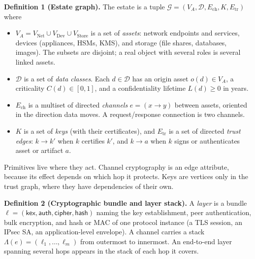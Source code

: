 \documentclass[conference]{IEEEtran}
\newenvironment{envblock}{\par\smallskip\noindent\ignorespaces}{\par\smallskip}
\begin{document}
\begin{envblock}

\textbf{Definition 1 (Estate graph).} The estate is a tuple $\mathcal{G} = (V_A, \mathcal{D}, E_{\mathrm{ch}}, K, E_{\mathrm{tr}})$ where

\begin{itemize}
\item $V_A = V_{\mathrm{Net}} \cup V_{\mathrm{Dev}} \cup V_{\mathrm{Store}}$ is a set of \emph{assets}: network endpoints and services, devices (appliances, HSMs, KMS), and storage (file shares, databases, images). The subsets are disjoint; a real object with several roles is several linked assets.
\item $\mathcal{D}$ is a set of \emph{data classes}. Each $d \in \mathcal{D}$ has an origin asset $o(d) \in V_A$, a criticality $C(d) \in [0,1]$, and a confidentiality lifetime $L(d) \ge 0$ in years.
\item $E_{\mathrm{ch}}$ is a multiset of directed \emph{channels} $e = (x \to y)$ between assets, oriented in the direction data moves. A request/response connection is two channels.
\item $K$ is a set of \emph{keys} (with their certificates), and $E_{\mathrm{tr}}$ is a set of directed \emph{trust edges}: $k \to k'$ when $k$ certifies $k'$, and $k \to a$ when $k$ signs or authenticates asset or artifact $a$.
\end{itemize}
\end{envblock}

Primitives live where they act. Channel cryptography is an edge attribute, because its effect depends on which hop it protects. Keys are vertices only in the trust graph, where they have dependencies of their own.

\begin{envblock}

\textbf{Definition 2 (Cryptographic bundle and layer stack).} A \emph{layer} is a bundle $\ell = (\mathsf{kex}, \mathsf{auth}, \mathsf{cipher}, \mathsf{hash})$ naming the key establishment, peer authentication, bulk encryption, and hash or MAC of one protocol instance (a TLS session, an IPsec SA, an application-level envelope). A channel carries a stack $\Lambda(e) = (\ell_1, \dots, \ell_m)$ from outermost to innermost. An end-to-end layer spanning several hops appears in the stack of each hop it covers.
\end{envblock}
\end{document}
